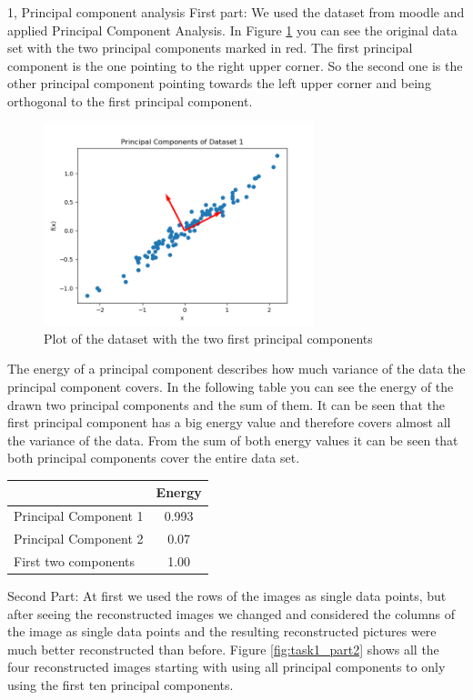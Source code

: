 \documentclass[10pt,a4paper]{article}
\begin{document}
\frontpage

\begin{task}{1, Principal component analysis}
First part: We used the dataset from moodle and applied Principal Component Analysis. In Figure \ref{fig:task1_part1} you can see the original data set with the two principal components marked in red. The first principal component is the one pointing to the right upper corner. So the second one is the other principal component pointing towards the left upper corner and being orthogonal to the first principal component.
\begin{figure}[H]
\centering
\includegraphics[width=0.7\textwidth]{../plots/task1/PCA_1.png}
\caption{Plot of the dataset with the two first principal components}
\label{fig:task1_part1}
\end{figure}
The energy of a principal component describes how much variance of the data the principal component covers. In the following table you can see the energy of the drawn two principal components and the sum of them. It can be seen that the first principal component has a big energy value and therefore covers almost all the variance of the data. From the sum of both energy values it can be seen that both principal components cover the entire data set.
\begin{center}
\begin{tabular}{l|c}
&Energy \\
\hline
Principal Component 1& 0.993\\
Principal Component 2& 0.07\\
First two components & 1.00\\
\hline
\end{tabular}
\end{center}
\bigbreak
Second Part: 
At first we used the rows of the images as single data points, but after seeing the reconstructed images we changed and considered the columns of the image as single data points and the resulting reconstructed pictures were much better reconstructed than before. Figure \ref{fig:task1_part2} shows all the four reconstructed images starting with using all principal components to only using the first ten principal components.

\end{task}
\end{document}
